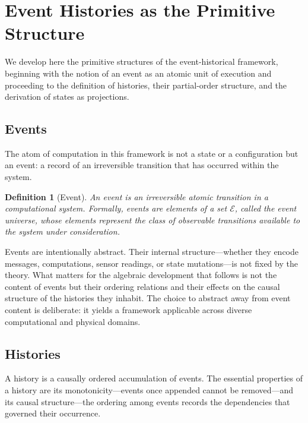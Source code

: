\documentclass[12pt]{article}
\newtheorem{definition}{Definition}
\begin{document}

\section{Event Histories as the Primitive Structure}
\label{sec:histories}

We develop here the primitive structures of the event-historical framework, beginning with the notion of an event as an atomic unit of execution and proceeding to the definition of histories, their partial-order structure, and the derivation of states as projections.

\subsection{Events}

The atom of computation in this framework is not a state or a configuration but an event: a record of an irreversible transition that has occurred within the system.

\begin{definition}[Event]
An \emph{event} is an irreversible atomic transition in a computational system. Formally, events are elements of a set $\mathcal{E}$, called the \emph{event universe}, whose elements represent the class of observable transitions available to the system under consideration.
\end{definition}

Events are intentionally abstract. Their internal structure---whether they encode messages, computations, sensor readings, or state mutations---is not fixed by the theory. What matters for the algebraic development that follows is not the content of events but their ordering relations and their effects on the causal structure of the histories they inhabit. The choice to abstract away from event content is deliberate: it yields a framework applicable across diverse computational and physical domains.

\subsection{Histories}

A history is a causally ordered accumulation of events. The essential properties of a history are its monotonicity---events once appended cannot be removed---and its causal structure---the ordering among events records the dependencies that governed their occurrence.
\end{document}
